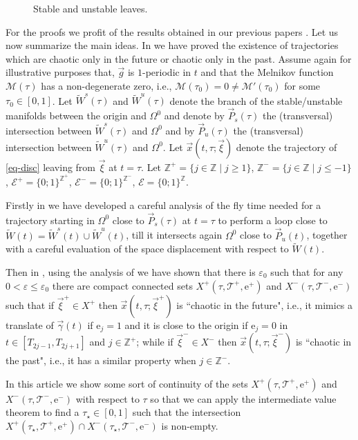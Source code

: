 \documentclass[10pt]{article}
\numberwithin{equation}{section}
\def\ga{\vec{\gamma}}
\def\ep{\varepsilon}
\def\Om{\Omega}
\def\Z{{\mathbb Z}}
\def\ee{{\mathrm e}}
\def\EE{{\mathcal E}}
\def\MM{{\mathcal M}}
\def\TT{{\mathcal T}}
\def\xxi{\vec{\xi}}
\def\x{\vec{x}}
\def\g{\vec{g}}
\theoremstyle{definition}
\theoremstyle{remark}
\begin{document}
\begin{figure}[t!]
\centerline{ }
\caption{Stable and unstable leaves.}
\label{LinL0}
\end{figure}


  For the proofs we profit of the results obtained in our previous papers \cite{CFPRimut, CFPrestate}.
  Let us now summarize the main ideas.
   In \cite{CFPrestate} we have proved the existence of  trajectories which are chaotic only in the future or chaotic only in the past.
  Assume again for illustrative purposes that,
 $\g$ is $1$-periodic in $t$   and  that the Melnikov function $\MM(\tau)$ has a non-degenerate zero, i.e., $\MM(\tau_0)=0 \ne \MM'(\tau_0)$
 for some $\tau_0 \in [0,  1]$.
 Let $\tilde{W}^s(\tau)$ and $\tilde{W}^u(\tau)$ denote the branch of  the stable/unstable manifolds between the origin and $\Om^0$
 and denote by $\vec{P}_s(\tau)$ the (transversal) intersection between $\tilde{W}^s(\tau)$ and $\Om^0$ and by
 $\vec{P}_u(\tau)$ the (transversal) intersection between $\tilde{W}^u(\tau)$ and $\Om^0$.
  Let $\x(t, \tau; \xxi)$ denote the trajectory of \eqref{eq-disc}  leaving from $\xxi$ at $t=\tau$.
  Let $\Z^+=\{j \in \Z \mid j \ge 1\}$,
 $\Z^-=\{j \in \Z \mid j \le -1\}$, $\EE^+=\{0; 1 \} ^{\Z^+}$, $\EE^- = \{0; 1 \} ^{\Z^-}$, $\EE =\{0; 1 \} ^{\Z}$.

 Firstly in \cite{CFPRimut} we have
developed a careful analysis of the fly time needed for a trajectory starting in $\Om^0$ close to $\vec{P}_s(\tau)$ at $t=\tau$
to perform a loop close to $\tilde{W}(t)= \tilde{W}^s(t)\cup \tilde{W}^u(t)$, till it intersects again $\Om^0$ close to  $\vec{P}_u(t)$, together with a careful
evaluation of the space displacement with respect to $\tilde{W}(t)$.


 Then in  \cite{CFPrestate}, using the analysis of \cite{CFPRimut} we have shown that there is $\ep_0$ such that for any $0< \ep \le \ep_0$  there are compact connected sets
$X^+(\tau,\TT^+, \ee^+)$ and $X^-(\tau,\TT^-, \ee^-)$ such that
if $\xxi^+ \in X^+$ then $\x(t,\tau; \xxi^+)$ is ``chaotic   in the future", i.e.,
it mimics a translate of $\ga(t)$  if $\ee_j=1$ and it is close to the origin if $\ee_j=0$ in $t \in [T_{2j-1}, T_{2j+1}]$ and $j \in \Z^+$;
while  if $\xxi^- \in X^-$ then $\x(t,\tau; \xxi^-)$ is ``chaotic in the past", i.e., it has a similar property when $j \in \Z^-$.



In this article we show some sort of continuity of the sets $X^+(\tau,\TT^+, \ee^+)$ and $X^-(\tau,\TT^-, \ee^-)$ with respect to $\tau$
so that we can
apply the intermediate value theorem to find a  $\tau_{\star}\in [0,1]$ such that
the intersection
$X^+(\tau_{\star},\TT^+, \ee^+)\cap X^-(\tau_{\star},\TT^-, \ee^-)$ is non-empty.
\end{document}
